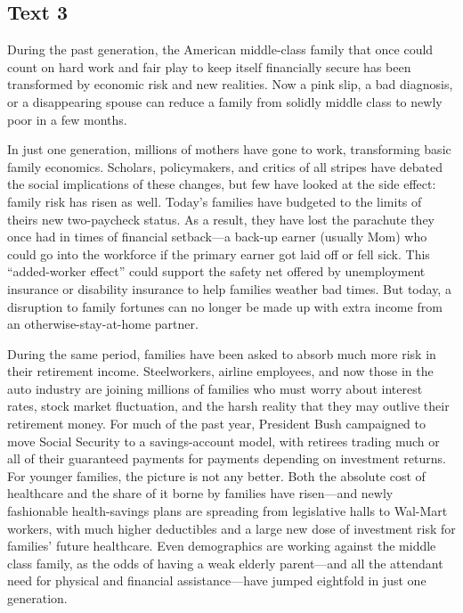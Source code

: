 \subsection{Text 3}


During the past generation, the American middle-class family that once
could count on hard work and fair play to keep itself financially secure
has been transformed by economic risk and new realities. Now a pink slip,
a bad diagnosis, or a disappearing spouse can reduce a family from
solidly middle class to newly poor in a few months.

In just one generation, millions of mothers have gone to
work, transforming basic family economics. Scholars, policymakers, and
critics of all stripes have debated the social implications of these
changes, but few have looked at the side effect: family risk has risen
as well. Today's families have budgeted to the limits of theirs new
two-paycheck status. As a result, they have lost the parachute they once
had in times of financial setback---a back-up earner (usually Mom) who
could go into the workforce if the primary earner got laid off or fell
sick. This ``added-worker effect'' could support the safety net offered
by unemployment insurance or disability insurance to help families
weather bad times. But today, a disruption to family fortunes can no
longer be made up with extra income from an otherwise-stay-at-home
partner.

During the same period, families have been asked to absorb much more
risk in their retirement income. Steelworkers, airline employees, and
now those in the auto industry are joining millions of families who must
worry about interest rates, stock market fluctuation, and the harsh
reality that they may outlive their retirement money. For much of the
past year, President Bush campaigned to move Social Security to a
savings-account model, with retirees trading much or all of their
guaranteed payments for payments depending on investment returns. For
younger families, the picture is not any better. Both the absolute cost
of healthcare and the share of it borne by families have risen---and
newly fashionable health-savings plans are spreading from legislative
halls to Wal-Mart workers, with much higher deductibles and a large new
dose of investment risk for families' future healthcare. Even
demographics are working against the middle class family, as the odds of
having a weak elderly parent---and all the attendant need for physical
and financial assistance---have jumped eightfold in just one generation.

